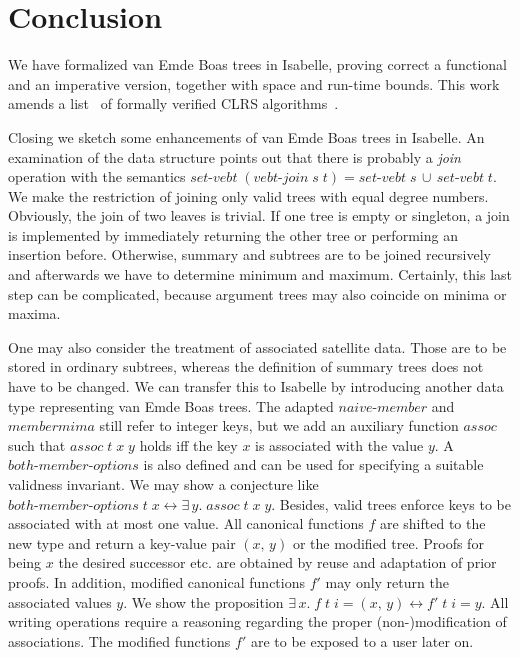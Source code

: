 \documentclass[11pt,a4paper]{article}
\begin{document}
\pagebreak

\tableofcontents
\pagebreak

\section{Conclusion}
We have formalized van Emde Boas trees in Isabelle, proving correct a functional and an imperative version, together with space and run-time bounds.
This work amends a list~\cite{NipkowEH-ATVA20} of formally verified CLRS algorithms~\cite{10.5555/1614191}.

Closing we sketch some enhancements of van Emde Boas trees in Isabelle.
An examination of the data structure points out that there is probably a \textit{join} operation with the semantics $set\text{-}vebt \;(vebt\text{-}join\; s \; t) = set\text{-}vebt \;s\, \cup\, set\text{-}vebt\; t$.
 We make the restriction of joining only valid trees with equal degree numbers. 
 Obviously, the join of two leaves is trivial. 
 If one tree is empty or singleton, a join is implemented by immediately returning the other tree or performing an insertion before.
  Otherwise, summary and subtrees are to be joined recursively and afterwards we have to determine minimum and maximum. Certainly, this last step can be complicated, because argument trees may also coincide on minima or maxima.

  One may also consider the treatment of associated satellite data.
 Those are to be stored in ordinary subtrees, whereas the definition of summary trees does not have to be changed. 
 We can transfer this to Isabelle by introducing another data type representing van Emde Boas trees.
  The adapted $naive\text{-}member$ and $membermima$ still refer to integer keys, but we add an auxiliary function $assoc$ such that $assoc\; t \; x \; y$ holds iff the key $x$ is associated with the value $y$. 
  A $both\text{-}member\text{-}options$ is also defined and can be used for specifying a suitable validness invariant.  We may show a conjecture like $both\text{-}member\text{-}options \; t \;x \longleftrightarrow \exists \, y. \; assoc \; t \; x \; y$. Besides, valid trees enforce keys to be associated with at most one value. 
  All canonical functions $f$  are shifted to the new type and return a key-value pair $(x, \, y)$ or the modified tree. Proofs for being $x$ the desired successor etc. are obtained by reuse and adaptation of prior proofs. 
  In addition, modified canonical functions $f'$ may only return the associated values $y$. We show the proposition $\exists \, x. \;f \; t \; i = (x, \, y) \longleftrightarrow f'\; t \; i = y$.
  All writing operations require a reasoning regarding the proper (non-)modification of associations. The modified functions $f'$ are to be exposed to a user later on.
\end{document}
